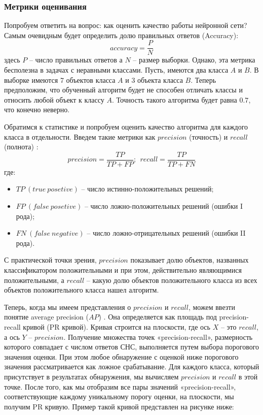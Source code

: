 \subsubsection{Метрики оценивания}

Попробуем ответить на вопрос: как оценить качество работы нейронной сети? Самым очевидным будет определить долю правильных ответов (Accuracy):
$$
accuracy = \frac{P}{N}
$$
здесь $P$ -- число правильных ответов а $N$ -- размер выборки. Однако, эта метрика бесполезна в задачах с неравными классами. Пусть, имеются два класса $A$ и $B$. В выборке имеются 7 объектов класса $A$ и 3 объекта класса $B$. Теперь предположим, что обученный алгоритм будет не способен отличать классы и относить любой объект к классу $A$. Точность такого алгоритма будет равна $0.7$, что конечно неверно.

Обратимся к статистике и попробуем оценить качество алгоритма для каждого класса в отдельности. Введем такие метрики как $precision$ (точность) и $recall$ (полнота) \cite{lib-ods-metrics}:
$$
precision = \frac{TP}{TP+FP};\ \ recall = \frac{TP}{TP+FN}
$$
где:
\begin{itemize}
    \item $TP\ (true\ posetive)$ -- число истинно-положительных решений;
    \item $FP\ (false\ posetive)$ -- число ложно-положительных решений (ошибки I рода);
    \item $FN\ (false\ negative)$ -- число ложно-отрицательных решений (ошибки II рода).
\end{itemize}

С практической точки зрения, $precision$ показывает долю объектов, названных классификатором положительными и при этом, действительно являющимися положительными, а $recall$ -- какую долю объектов положительного класса из всех объектов положительного класса нашел алгоритм.

Теперь, когда мы имеем представления о $precision$ и $recall$, можем ввезти понятие average precision ($AP$) \cite{lib-map-metric}. Она определяется как площадь под precision-recall кривой (PR кривой). Кривая строится на плоскости, где ось $X$ -- это $recall$, а ось $Y$ -- $precision$. Получение множества точек «precision-recall», размерность которого совпадает с числом ответов СНС, выполняется путем выбора порогового значения оценки. При этом любое обнаружение с оценкой ниже порогового значения рассматривается как ложное срабатывание. Для каждого класса, который присутствует в результатах обнаружения, мы вычисляем $precision$ и $recall$ в этой точке. После того, как мы отобразим все пары значений «precision-recall», соответствующие каждому уникальному порогу оценки, на плоскости, мы получим PR кривую. Пример такой кривой представлен на рисунке ниже:

